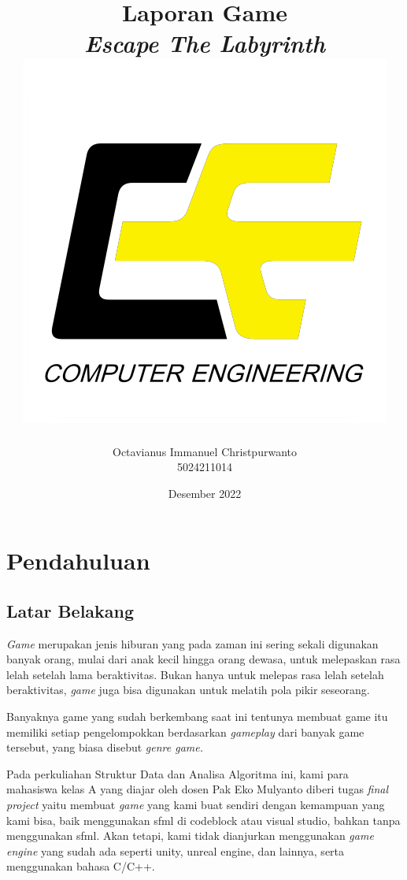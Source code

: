 \documentclass[oneside, a4paper ,12pt]{book}
\begin{document}
\author{Octavianus Immanuel Christpurwanto \\ 5024211014}
\title{Laporan Game \\ \emph{Escape The Labyrinth} \\ \includegraphics[width=8 cm]{screenshot001.png}}
\date{Desember 2022}

\frontmatter
\maketitle
\tableofcontents

\mainmatter
\chapter{Pendahuluan}
\section{Latar Belakang}

 \textit{Game} merupakan jenis hiburan yang pada zaman ini sering sekali digunakan banyak orang, mulai dari anak kecil hingga orang dewasa, untuk melepaskan rasa lelah setelah lama beraktivitas. Bukan hanya untuk melepas rasa lelah setelah beraktivitas, \textit{game} juga bisa digunakan untuk melatih pola pikir seseorang.
 
 Banyaknya game yang sudah berkembang saat ini tentunya membuat game itu memiliki setiap pengelompokkan berdasarkan \textit{gameplay} dari banyak game tersebut, yang biasa disebut \textit{genre game.}
 
 Pada perkuliahan Struktur Data dan Analisa Algoritma ini, kami para mahasiswa kelas A yang diajar oleh dosen Pak Eko Mulyanto diberi tugas \emph{final project} yaitu membuat \emph{game} yang kami buat sendiri dengan kemampuan yang kami bisa, baik menggunakan sfml di codeblock atau visual studio, bahkan tanpa menggunakan sfml. Akan tetapi, kami tidak dianjurkan menggunakan \emph{game engine} yang sudah ada seperti unity, unreal engine, dan lainnya, serta menggunakan bahasa C/C++.
 
\end{document}
